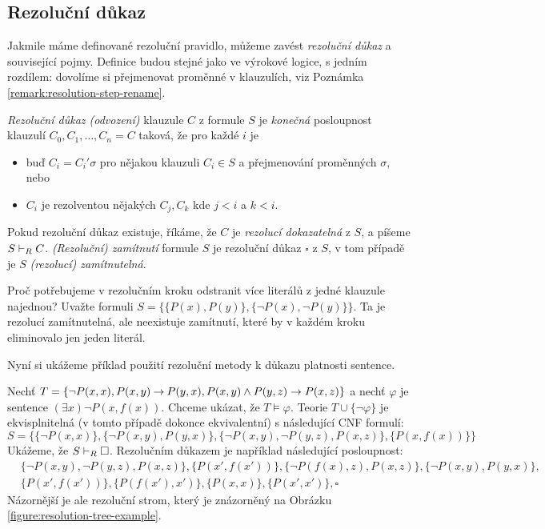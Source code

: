 \subsection{Rezoluční důkaz}

Jakmile máme definované rezoluční pravidlo, můžeme zavést \emph{rezoluční důkaz} a související pojmy. Definice budou stejné jako ve výrokové logice, s jedním rozdílem: dovolíme si přejmenovat proměnné v klauzulích, viz Poznámka \ref{remark:resolution-step-rename}.


\begin{definition}
    \emph{Rezoluční důkaz (odvození)} klauzule $C$ z formule $S$ je \emph{konečná} posloupnost klauzulí $C_0,C_1,\dots,C_n=C$
    taková, že pro každé $i$ je 
    \begin{itemize}
        \item buď $C_i=C_i'\sigma$ pro nějakou klauzuli $C_i\in S$ a přejmenování proměnných $\sigma$, nebo
        \item $C_i$ je rezolventou nějakých $C_j,C_k$ kde $j<i$ a $k<i$.
    \end{itemize}
    Pokud rezoluční důkaz existuje, říkáme, že $C$ je \emph{rezolucí dokazatelná} z $S$, a píšeme $S\vdash_R C$. \emph{(Rezoluční) zamítnutí} formule $S$ je rezoluční důkaz $\square$ z $S$, v tom případě je $S$ \emph{(rezolucí) zamítnutelná}.
\end{definition}

\begin{remark}
    Proč potřebujeme v rezolučním kroku odstranit více literálů z jedné klauzule najednou? Uvažte formuli $S=\{\{P(x),P(y)\},\{\neg P(x),\neg P(y)\}\}$. Ta je rezolucí zamítnutelná, ale neexistuje zamítnutí, které by v každém kroku eliminovalo jen jeden literál.
\end{remark}

Nyní si ukážeme příklad použití rezoluční metody k důkazu platnosti sentence.

\begin{example}\label{example:resolution-proof-predicate}
Nechť $T=\{\neg P(x,x),P(x,y) \mathbin{\rightarrow} P(y,x), P(x,y)\land P(y,z)\to P(x,z)\}$ a nechť $\varphi$ je sentence $(\exists x)\neg P(x,f(x))$. Chceme ukázat, že $T\models\varphi$. Teorie $T\cup\{\neg\varphi\}$ je ekvisplnitelná (v tomto případě dokonce ekvivalentní) s následující CNF formulí:
$$S=\{\{\neg P(x,x)\},\{\neg P(x,y),P(y,x)\},\{\neg P(x,y),\neg P(y,z), P(x,z)\},\{P(x,f(x))\}\}$$
Ukážeme, že $S\vdash_R\square$. Rezolučním důkazem je například následující posloupnost:
\begin{align*}
    &\{\neg P(x,y),\neg P(y,z), P(x,z)\},
    \{P(x',f(x'))\},
    \{\neg P(f(x),z),P(x,z)\},
    \{\neg P(x,y),P(y,x)\},\\
    &\{P(x',f(x'))\},
    \{P(f(x'),x')\},
    \{P(x,x)\},
    \{P(x',x')\},
    \square   
\end{align*}
Názornější je ale rezoluční strom, který je znázorněný na Obrázku \ref{figure:resolution-tree-example}.
\end{example}


